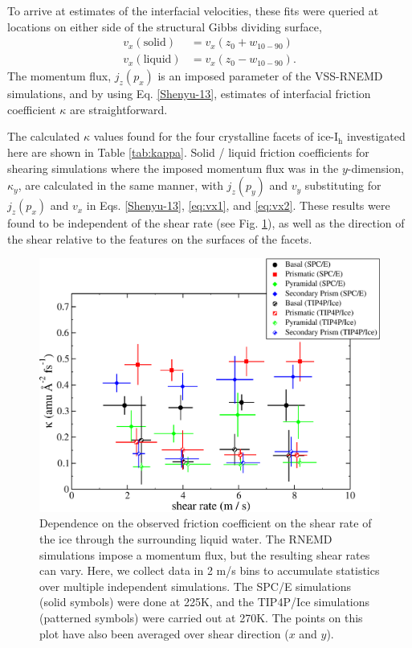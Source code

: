 To arrive at estimates of
the interfacial velocities, these fits were queried at locations on
either side of the structural Gibbs dividing surface,
\begin{align}
v_{x}(\mathrm{solid}) & = v_{x}( z_0 + w_\mathrm{10-90})  \label{eq:vx1}\\
v_{x}(\mathrm{liquid}) & = v_{x}( z_0 - w_\mathrm{10-90}). \label{eq:vx2}
\end{align}
The momentum flux, $j_{z}(p_{x})$ is an imposed parameter of the
VSS-RNEMD simulations, and by using Eq. \eqref{Shenyu-13}, estimates
of interfacial friction coefficient $\kappa$ are straightforward.

The calculated $\kappa$ values found for the four crystalline facets
of ice-I$_\mathrm{h}$ investigated here are shown in Table
\ref{tab:kappa}. Solid / liquid friction coefficients for shearing
simulations where the imposed momentum flux was in the $y$-dimension,
$\kappa_{y}$, are calculated in the same manner, with $j_{z}(p_{y})$
and $v_{y}$ substituting for $j_{z}(p_{x})$ and $v_{x}$ in
Eqs. \eqref{Shenyu-13}, \eqref{eq:vx1}, and \eqref{eq:vx2}.  These
results were found to be independent of the shear rate (see
Fig. \ref{fig:kappaPlot}), as well as the direction of the shear
relative to the features on the surfaces of the facets.


\begin{figure}
\includegraphics[width=\linewidth]{Figures/kappaPlot2}
\caption{\label{fig:kappaPlot} Dependence on the observed friction
  coefficient on the shear rate of the ice through the surrounding
  liquid water.  The RNEMD simulations impose a momentum flux, but the
  resulting shear rates can vary.  Here, we collect data in 2 m/s bins
  to accumulate statistics over multiple independent simulations.  The
  SPC/E simulations (solid symbols) were done at 225K, and the
  TIP4P/Ice simulations (patterned symbols) were carried out at
  270K. The points on this plot have also been averaged over shear
  direction ($x$ and $y$).}
\end{figure}



